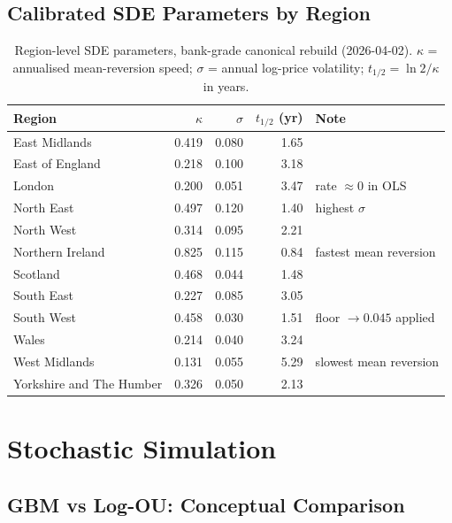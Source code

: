 \documentclass[11pt,a4paper]{article}
\theoremstyle{plain}
\theoremstyle{definition}
\newcommand{\kap}{\kappa}
\newcommand{\sig}{\sigma}
\begin{document}
\subsection{Calibrated SDE Parameters by Region}

\begin{table}[htbp]
\caption{Region-level SDE parameters, bank-grade canonical rebuild
(2026-04-02).  $\kap$ = annualised mean-reversion speed;
$\sig$ = annual log-price volatility;
$t_{1/2} = \ln 2 / \kap$ in years.}
\label{tab:sde}
\centering\small
\begin{tabular}{lrrrl}
\toprule
Region & $\kap$ & $\sig$ & $t_{1/2}$ (yr) & Note \\
\midrule
East Midlands             & 0.419 & 0.080 & 1.65 & \\
East of England           & 0.218 & 0.100 & 3.18 & \\
London                    & 0.200 & 0.051 & 3.47 & rate $\approx 0$ in OLS \\
North East                & 0.497 & 0.120 & 1.40 & highest $\sig$ \\
North West                & 0.314 & 0.095 & 2.21 & \\
Northern Ireland          & 0.825 & 0.115 & 0.84 & fastest mean reversion \\
Scotland                  & 0.468 & 0.044 & 1.48 & \\
South East                & 0.227 & 0.085 & 3.05 & \\
South West                & 0.458 & 0.030 & 1.51 & floor $\to 0.045$ applied \\
Wales                     & 0.214 & 0.040 & 3.24 & \\
West Midlands             & 0.131 & 0.055 & 5.29 & slowest mean reversion \\
Yorkshire and The Humber  & 0.326 & 0.050 & 2.13 & \\
\bottomrule
\end{tabular}
\end{table}

\section{Stochastic Simulation}

\subsection{GBM vs Log-OU: Conceptual Comparison}
\end{document}
